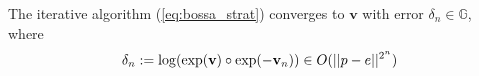 
\begin{theorem}[Bossa]\label{th:bossa}
	The iterative algorithm (\ref{eq:bossa_strat}) converges to $\mathbf{v}$ with error $\delta_n \in \mathbb{G}$, where
	\begin{align*}
	\delta_{n} := \log(\exp(\mathbf{v})\circ \exp(-\mathbf{v}_{n})) \in O(\vert\lvert p - e \rvert\vert^{2^{n}})
	\end{align*}
\end{theorem}

